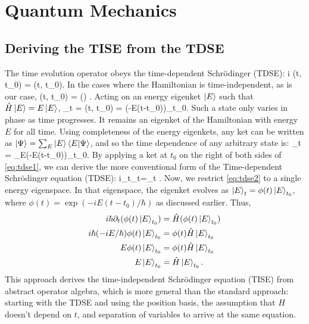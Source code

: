 \chapter{Quantum Mechanics}
\section{Deriving the TISE from the TDSE}
The time evolution operator obeys the time-dependent Schr{\"o}dinger (TDSE):
\be 
	i\hbar \; (t, t_0) = (t, t_0)\label{eq:tdse1}.
\ee
In the cases where the Hamiltonian is time-independent, as is our case, 
\be
	(t, t_0) = \exp\left(\right) \label{eq:timeevol}.
\ee
Acting on an energy eigenket $\ket{E}$ such that $\hat{H}\ket{E} = E\ket{E}$, 
\bea
	_t = (t, t_0) = \exp\left(-E(t-t_0)\right)_{t_0}.
\eea
Such a state only varies in phase as time progresses. It remains an eigenket of the Hamiltonian with energy $E$ for all time. Using completeness of the energy eigenkets, any ket can be written as $\ket{\Psi} = \sum_{E}\ket{E}\braket{E|\Psi}$, and so the time dependence of any arbitrary state is:
\bea
	\ket{\Psi}_t = \sum_E\exp\left(-E(t-t_0)\right)_{t_0}.
\eea
By applying a ket at $t_0$ on the right of both sides of \cref{eq:tdse1}, we can derive the more conventional form of the Time-dependent Schr{\"o}dinger equation (TDSE):
\be
	i\hbar\;\partial_t\ket{\Psi}_t=\ket{\Psi}_t \label{eq:tdse2}.
\ee
Now, we restrict \cref{eq:tdse2} to a single energy eigenspace. In that eigenspace, the eigenket evolves as $\ket{E}_t = \phi(t) \ket{E}_{t_0}$, where $\phi(t) =\exp(-iE(t-t_0)/\hbar)$ as discussed earlier. Thus, 
\begin{align*}
	i\hbar \partial_t(\phi(t)\ket{E}_{t_0}) &= \hat{H}(\phi(t)\ket{E}_{t_0}) \\
	i\hbar(-iE/\hbar)\phi(t)\ket{E}_{t_0} &= \phi(t)\hat{H}\ket{E}_{t_0} \\
	E\phi(t)\ket{E}_{t_0} &= \phi(t) \hat{H}\ket{E}_{t_0} \\
	E\ket{E}_{t_0} &= \hat{H}\ket{E}_{t_0}.
\end{align*}
This approach derives the time-independent Schr{\"o}dinger equation (TISE) from abstract operator algebra, which is more general than the standard approach: starting with the TDSE and using the position basis, the assumption that $H$ doesn't depend on $t$, and separation of variables to arrive at the same equation.




